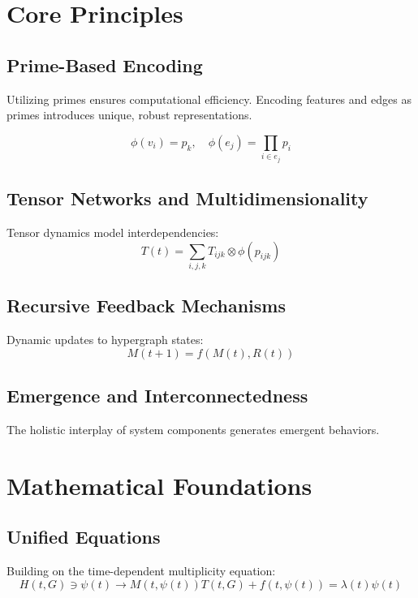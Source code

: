 \documentclass{article}
\theoremstyle{plain}
\begin{document}
\section{Core Principles}
\subsection{Prime-Based Encoding}
Utilizing primes ensures computational efficiency. Encoding features and edges as primes introduces unique, robust representations.

\begin{equation}
\phi(v_i) = p_k, \quad \phi(e_j) = \prod_{i \in e_j} p_i
\end{equation}

\subsection{Tensor Networks and Multidimensionality}
Tensor dynamics model interdependencies:
\begin{equation}
T(t) = \sum_{i,j,k} T_{ijk} \otimes \phi(p_{ijk})
\end{equation}

\subsection{Recursive Feedback Mechanisms}
Dynamic updates to hypergraph states:
\begin{equation}
M(t+1) = f(M(t), R(t))
\end{equation}

\subsection{Emergence and Interconnectedness}
The holistic interplay of system components generates emergent behaviors.

\section{Mathematical Foundations}
\subsection{Unified Equations}
Building on the time-dependent multiplicity equation:
\begin{equation}
H(t, G) \ni \psi(t) \to M(t, \psi(t)) T(t, G) + f(t, \psi(t)) = \lambda(t) \psi(t)
\end{equation}
\end{document}
